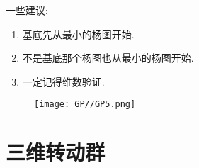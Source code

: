 \documentclass{ctexart}
\begin{document}
一些建议:\begin{enumerate}
    \item 基底先从最小的杨图开始.
    \item 不是基底那个杨图也从最小的杨图开始.
    \item 一定记得维数验证.
\end{enumerate}

\begin{figure}[H]
    \centering
    \texttt{[image: GP//GP5.png]}
\end{figure}

\section{三维转动群}
\end{document}
